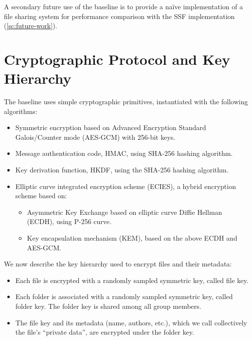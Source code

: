 A secondary future use of the baseline is to provide a
na\"ive implementation of a file sharing system 
for performance comparison with the SSF implementation (\cref{sc:future-work}). 

\section{Cryptographic Protocol and Key Hierarchy}\label{sc:baseline-protocol-hierarcy}

The baseline uses simple cryptographic primitives, instantiated with the following algorithms:
\begin{itemize}
    \item Symmetric encryption based on Advanced Encryption Standard Galois/Counter mode (AES-GCM) with 256-bit keys.
    \item Message authentication code, HMAC, using SHA-256 hashing algorithm. 
    \item Key derivation function, HKDF, using the SHA-256 hashing algorithm.
    \item Elliptic curve integrated encryption scheme (ECIES), a hybrid encryption scheme based on:
    \begin{itemize}
        \item Asymmetric Key Exchange based on elliptic curve Diffie Hellman (ECDH), using P-256 curve.
        \item Key encapsulation mechanism (KEM), based on the above ECDH and AES-GCM.    
    \end{itemize}
\end{itemize}

We now describe the key hierarchy used to encrypt files and their metadata:
\begin{itemize}
    \item Each file is encrypted with a randomly sampled symmetric key, called file key.
    \item Each folder is associated with a randomly sampled symmetric key, called folder key. The folder key is shared among all group members.
    \item The file key and its metadata (name, authors, etc.), which we call collectively the file's ``private data'', are encrypted under the folder key.
\end{itemize}

